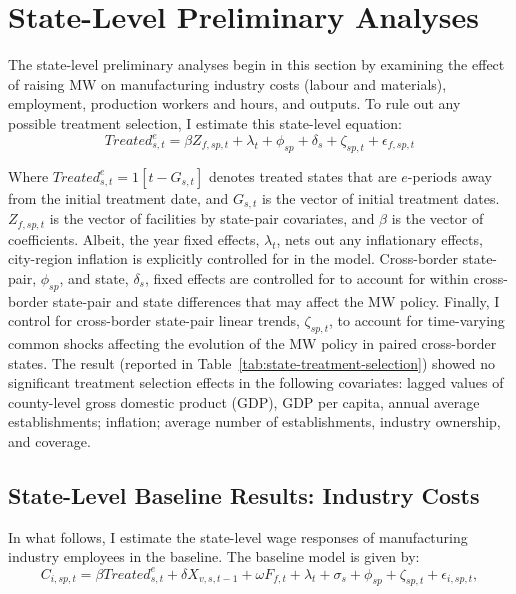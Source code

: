 \documentclass[authoryear, preprint, twocolumn, 1p]{elsarticle}
\begin{document}
    \section{State-Level Preliminary Analyses}\label{sec:state-level-preliminary-analyses}
    The state-level preliminary analyses begin in this section by examining the effect of raising MW on manufacturing industry costs (labour and materials), employment, production workers and hours, and outputs. To rule out any possible treatment selection, I estimate this state-level equation:
    \begin{equation}
        Treated_{s,t}^e = \beta Z_{f,sp,t} + \lambda_{t} + \phi_{sp} + \delta_{s} + \zeta_{sp,t} + \epsilon_{f,sp,t}\label{eq:state-treatment-selection}
    \end{equation}

    Where $Treated_{s,t}^e = 1[t - G_{s,t}]$ denotes treated states that are $e$-periods away from the initial treatment date, and $G_{s,t}$ is the vector of initial treatment dates. $Z_{f,sp,t}$ is the vector of facilities by state-pair covariates, and $\beta$ is the vector of coefficients. Albeit, the year fixed effects, $\lambda_{t}$, nets out any inflationary effects, city-region inflation is explicitly controlled for in the model. Cross-border state-pair, $\phi_{sp}$, and state, $\delta_{s}$, fixed effects are controlled for to account for within cross-border state-pair and state differences that may affect the MW policy. Finally, I control for cross-border state-pair linear trends, $\zeta_{sp,t}$, to account for time-varying common shocks affecting the evolution of the MW policy in paired cross-border states. The result (reported in Table~\ref{tab:state-treatment-selection}) showed no significant treatment selection effects in the following covariates: lagged values of county-level gross domestic product (GDP), GDP per capita, annual average establishments; inflation; average number of establishments, industry ownership, and coverage.
    

    \subsection{State-Level Baseline Results: Industry Costs}\label{subsec:state-level-baseline-results-industry-costs}
    In what follows, I estimate the state-level wage responses of manufacturing industry employees in the baseline. The baseline model is given by:
    \begin{equation}
        C_{i,sp,t} = \beta Treated_{s,t}^e + \delta X_{v,s,t-1} + \omega F_{f,t} + \lambda_{t} + \sigma_{s} + \phi_{sp} + \zeta_{sp,t} + \epsilon_{i,sp,t},\label{eq:state-baseline-wages}
    \end{equation}
\end{document}
